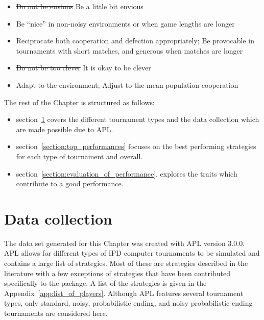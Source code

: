 \begin{itemize}
    \item \st{Do not be envious} Be a little bit envious
    \item Be ``nice'' in non-noisy environments or when game lengths are longer
    \item Reciprocate both cooperation and defection appropriately;
    Be provocable in tournaments with short matches, and generous when matches are longer
    \item \st{Do not be too clever} It is okay to be clever
    \item Adapt to the environment; Adjust to the mean population cooperation
\end{itemize}

The rest of the Chapter is structured as follows:

\begin{itemize}
    \item section~\ref{section:data_collection} covers the different tournament
    types and the data collection which are made possible due to APL.
    \item section~\ref{section:top_performances} focuses on the best performing
    strategies for each type of tournament and overall.
    \item section~\ref{section:evaluation_of_performance}, explores the traits
    which contribute to a good performance.
\end{itemize}

\section{Data collection}\label{section:data_collection}

The data set generated for this Chapter was created with APL version 3.0.0.
APL allows for different types of IPD computer
tournaments to be simulated and contains a large list of strategies.
Most of these are strategies described in the literature with a few exceptions
of strategies that have been contributed specifically to the package. A
list of the strategies is given in the Appendix~\ref{app:list_of_players}.
Although APL features several tournament types, only
standard, noisy, probabilistic ending, and noisy probabilistic ending
tournaments are considered here.

